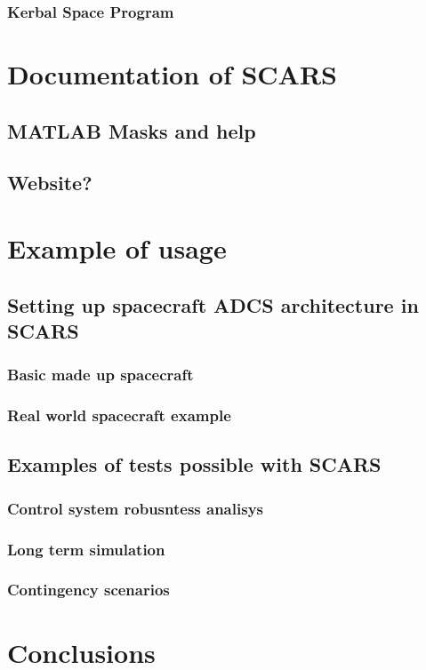 \documentclass{article}
\begin{document}
\subsubsection{Kerbal Space Program}
\section{Documentation of SCARS}
\subsection{MATLAB Masks and help}
\subsection{Website?}
\section{Example of usage}
\subsection{Setting up spacecraft ADCS architecture in SCARS}
\subsubsection{Basic made up spacecraft}
\subsubsection{Real world spacecraft example}
\subsection{Examples of tests possible with SCARS}
\subsubsection{Control system robusntess analisys}
\subsubsection{Long term simulation}
\subsubsection{Contingency scenarios}
\section{Conclusions}
\end{document}
